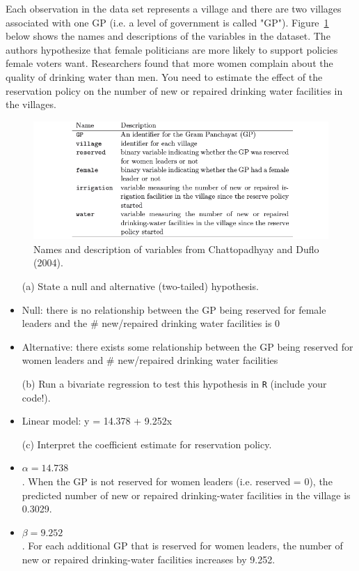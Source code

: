 \documentclass[12pt,letterpaper]{article}
\begin{document}
\noindent Each observation in the data set represents a village and there are two villages associated with one GP (i.e. a level of government is called "GP"). Figure~\ref{fig:women_desc} below shows the names and descriptions of the variables in the dataset. The authors hypothesize that female politicians are more likely to support policies female voters want. Researchers found that more women complain about the quality of drinking water than men. You need to estimate the effect of the reservation policy on the number of new or repaired drinking water facilities in the villages.
\vspace{.5cm}
\begin{figure}[h!]
	\caption{\footnotesize{Names and description of variables from Chattopadhyay and Duflo (2004).}}
	\vspace{.5cm}
	\centering
	\label{fig:women_desc}
	\includegraphics[width=1.1\textwidth]{../women_desc.png}
\end{figure}		

\begin{itemize}
	\item [(a)] State a null and alternative (two-tailed) hypothesis. 
	\item 
	Null: there is no relationship between the GP being reserved for female leaders and the {\#} new/repaired drinking water facilities is 0
	\item
	Alternative: there exists some relationship between the GP being reserved for women leaders and {\#} new/repaired drinking water facilities
	\vspace{1cm}
	\newpage
	\item [(b)] Run a bivariate regression to test this hypothesis in \texttt{R} (include your code!).
	\item
	Linear model: y = 14.378 + 9.252x
	
	\vspace{2cm}
	\item [(c)] Interpret the coefficient estimate for reservation policy. 
	\item
	$\alpha = 14.738$\\. When the GP is not reserved for women leaders (i.e. reserved = 0), the predicted number of new or repaired drinking-water facilities in the village is 0.3029.
	\item
	$\beta = 9.252$\\. For each additional GP that is reserved for women leaders, the number of new or repaired drinking-water facilities increases by 9.252.
	
\end{itemize}
\end{document}

